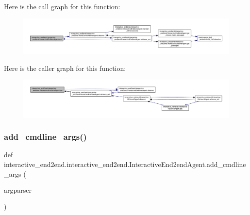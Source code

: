 Here is the call graph for this function\+:
\nopagebreak
\begin{figure}[H]
\begin{center}
\leavevmode
\includegraphics[width=350pt]{classinteractive__end2end_1_1interactive__end2end_1_1InteractiveEnd2endAgent_a20a0561cd5fc7008644d4cc18adc8f42_cgraph}
\end{center}
\end{figure}
Here is the caller graph for this function\+:
\nopagebreak
\begin{figure}[H]
\begin{center}
\leavevmode
\includegraphics[width=350pt]{classinteractive__end2end_1_1interactive__end2end_1_1InteractiveEnd2endAgent_a20a0561cd5fc7008644d4cc18adc8f42_icgraph}
\end{center}
\end{figure}
\mbox{\label{classinteractive__end2end_1_1interactive__end2end_1_1InteractiveEnd2endAgent_ad6712805a88e2999f531f764022f2de4}} 
\subsubsection{\texorpdfstring{add\+\_\+cmdline\+\_\+args()}{add\_cmdline\_args()}}
{\footnotesize\ttfamily def interactive\+\_\+end2end.\+interactive\+\_\+end2end.\+Interactive\+End2end\+Agent.\+add\+\_\+cmdline\+\_\+args (\begin{DoxyParamCaption}\item[{}]{argparser }\end{DoxyParamCaption})\hspace{0.3cm}{\ttfamily [static]}}

